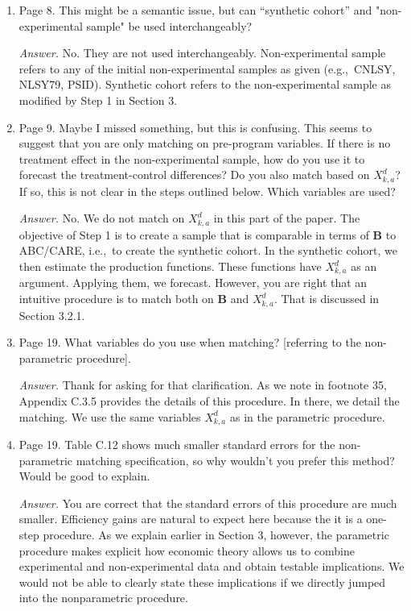 \begin{enumerate}

\item Page 8. This might be a semantic issue, but can ``synthetic cohort'' and "non-experimental sample" be used interchangeably?

\noindent \textit{Answer.} No. They are not used interchangeably. Non-experimental sample refers to any of the initial non-experimental samples as given (e.g.,\ CNLSY, NLSY79, PSID). Synthetic cohort refers to the non-experimental sample as modified by Step 1 in Section 3.

\item Page 9. Maybe I missed something, but this is confusing. This seems to suggest that you are only matching on pre-program variables. If there is no treatment effect in the non-experimental sample, how do you use it to forecast the treatment-control differences? Do you also match based on $X^d_{k,a}$? If so, this is not clear in the steps outlined below. Which variables are used?

\noindent \textit{Answer.} No. We do not match on $X^d_{k,a}$ in this part of the paper. The objective of Step 1 is to create a sample that is comparable in terms of $\bm{B}$ to ABC/CARE, i.e.,\ to create the synthetic cohort. In the synthetic cohort, we then estimate the production functions. These functions have $X^d_{k,a}$ as an argument. Applying them, we forecast. However, you are right that an intuitive procedure is to match both on  $\bm{B}$ and $X^d_{k,a}$. That is discussed in Section 3.2.1.

\item Page 19. What variables do you use when matching? [referring to the non-parametric procedure]. 

\noindent \textit{Answer.} Thank for asking for that clarification. As we note in footnote 35, Appendix C.3.5 provides the details of this procedure. In there, we detail the matching. We use the same variables  $X^d_{k,a}$ as in the parametric procedure.

\item Page 19. Table C.12 shows much smaller standard errors for the non-parametric matching specification, so why wouldn't you prefer this method? Would be good to explain.

\noindent \textit{Answer.} You are correct that the standard errors of this procedure are much smaller. Efficiency gains are natural to expect here because the it is a one-step procedure. As we explain earlier in Section 3, however, the parametric procedure makes explicit how economic theory allows us to combine experimental and non-experimental data and obtain testable implications. We would not be able to clearly state these implications if we directly jumped into the nonparametric procedure. 


\end{enumerate}
